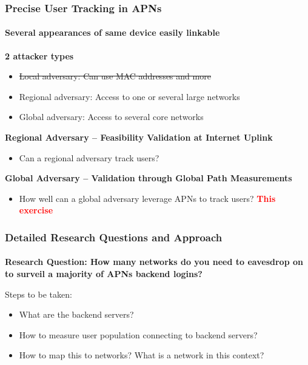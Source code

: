 \begin{frame}
\frametitle{Precise User Tracking in APNs}
\framesubtitle{Several appearances of same device easily linkable}

\textbf{2 attacker types}\\
\begin{itemize}
\item \st{Local adversary: Can use MAC addresses and more}
\item Regional adversary: Access to one or several large networks 
\item Global adversary: Access to several core networks
\end{itemize}

\textbf{Regional Adversary -- Feasibility Validation at Internet Uplink}\\
\begin{itemize}
\item Can a regional adversary track users?  \textcolor{TUMGreen}{\checkmark}
\end{itemize}

\textbf{Global Adversary -- Validation through Global Path Measurements}\\
\begin{itemize}
	\item How well can a global adversary leverage APNs to track users? \textcolor{red}{\textbf{This exercise}}
\end{itemize}

\end{frame}
\clearpage


\begin{frame}
\frametitle{Detailed Research Questions and Approach}
\framesubtitle{}

\textbf{Research Question: How many networks do you need to eavesdrop on to surveil a majority of APNs backend logins?}

Steps to be taken:
\begin{itemize}
	\item What are the backend servers?
	\item How to measure user population connecting to backend servers?
	\item How to map this to networks? What is a network in this context?
\end{itemize}
\end{frame}
\clearpage

